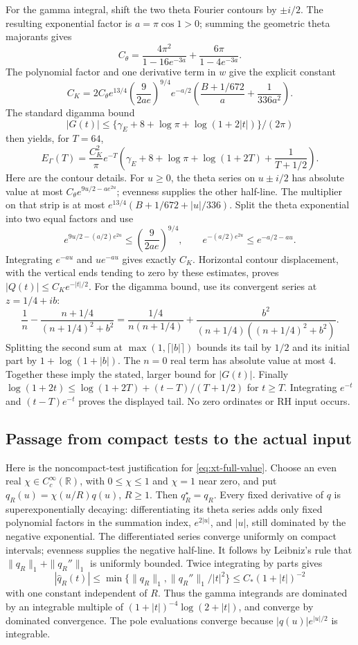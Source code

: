 For the gamma integral, shift the two theta Fourier contours by \(\pm i/2\).
The resulting exponential factor is \(a=\pi\cos1>0\); summing the geometric
theta majorants gives
\[
 C_\theta=\frac{4\pi^2}{1-16e^{-3a}}
           +\frac{6\pi}{1-4e^{-3a}}.
\]
The polynomial factor and one derivative term in \(w\) give the explicit
constant
\[
 C_K=2C_\theta e^{13/4}
 \left(\frac{9}{2ae}\right)^{9/4}e^{-a/2}
 \left(\frac{B+1/672}{a}+\frac1{336a^2}\right).
\]
The standard digamma bound
\[
 |G(t)|\le\{\gamma_E+8+\log\pi+\log(1+2|t|)\}/(2\pi)
\]
then yields, for \(T=64\),
\begin{equation}\label{eq:xt-gamma-tail}
 E_\Gamma(T)=\frac{C_K^2}{\pi}e^{-T}
 \left(\gamma_E+8+\log\pi+\log(1+2T)+\frac1{T+1/2}\right).
\end{equation}
Here are the contour details. For \(u\ge0\), the theta series on
\(u\pm i/2\) has absolute value at most
\(C_\theta e^{9u/2-ae^{2u}}\); evenness supplies the other half-line.
The multiplier on that strip is at most
\(e^{13/4}(B+1/672+|u|/336)\).
Split the theta exponential into two equal factors and use
\[
 e^{9u/2-(a/2)e^{2u}}\le
       \left(\frac9{2ae}\right)^{9/4},\qquad
 e^{-(a/2)e^{2u}}\le e^{-a/2-au}.
\]
Integrating \(e^{-au}\) and \(ue^{-au}\) gives exactly \(C_K\).
Horizontal contour displacement, with the vertical ends tending to zero
by these estimates, proves \(|Q(t)|\le C_K e^{-|t|/2}\).
For the digamma bound, use its convergent series at \(z=1/4+ib\):
\[
 \frac1n-\frac{n+1/4}{(n+1/4)^2+b^2}
 =\frac{1/4}{n(n+1/4)}
  +\frac{b^2}{(n+1/4)((n+1/4)^2+b^2)}.
\]
Splitting the second sum at \(\max(1,\lceil |b|\rceil)\) bounds its
tail by \(1/2\) and its initial part by \(1+\log(1+|b|)\).
The \(n=0\) real term has absolute value at most \(4\).
Together these imply the stated, larger bound for \(|G(t)|\).
Finally \(\log(1+2t)\le\log(1+2T)+(t-T)/(T+1/2)\) for \(t\ge T\).
Integrating \(e^{-t}\) and \((t-T)e^{-t}\) proves the displayed tail.
No zero ordinates or RH input occurs.

\subsection{Passage from compact tests to the actual input}

Here is the noncompact-test justification for
\eqref{eq:xt-full-value}. Choose an even real
\(\chi\in C_c^\infty(\mathbb R)\), with \(0\le\chi\le1\) and
\(\chi=1\) near zero, and put \(q_R(u)=\chi(u/R)q(u)\), \(R\ge1\).
Then \(q_R^\star=q_R\). Every fixed derivative of \(q\) is
superexponentially decaying: differentiating its theta series adds only
fixed polynomial factors in the summation index, \(e^{2|u|}\), and
\(|u|\), still dominated by the negative exponential. The differentiated
series converge uniformly on compact intervals; evenness supplies the
negative half-line. It follows by Leibniz's rule that
\(\|q_R\|_1+\|q_R''\|_1\) is uniformly bounded.
Twice integrating by parts gives
\[
 |\widehat q_R(t)|
 \le \min\{\|q_R\|_1,\|q_R''\|_1/|t|^2\}
 \le C_*(1+|t|)^{-2}
\]
with one constant independent of \(R\). Thus the gamma integrands are
dominated by an integrable multiple of
\((1+|t|)^{-4}\log(2+|t|)\), and converge by dominated convergence.
The pole evaluations converge because
\(|q(u)|e^{|u|/2}\) is integrable.

